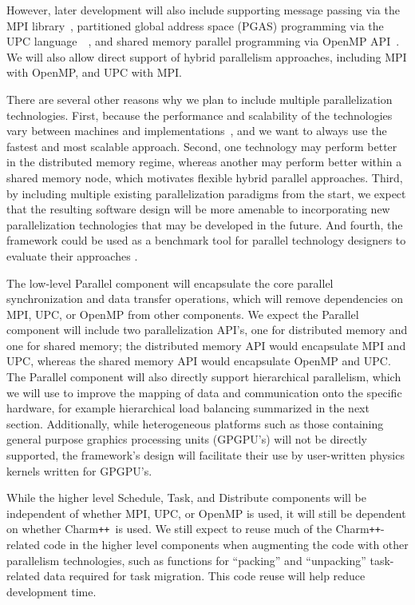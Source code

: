 \documentclass[11pt,letterpaper]{article}
\newcommand{\pp}{\texttt{++}}
\newcommand{\charm}{\textsf{Charm\pp}}
\newcommand{\code}[1]{\textsf{#1}}
\begin{document}
However, later development will also include supporting message
passing via the MPI library~\cite{wwwmpi}, partitioned global address
space (PGAS) programming via the UPC
language~\cite{wwwupc}~\cite{upc}, and shared memory parallel
programming via OpenMP API~\cite{wwwopenmp}.  We will also allow
direct support of hybrid parallelism approaches, including MPI with
OpenMP, and UPC with MPI. 

There are several other reasons why we plan to include multiple
parallelization technologies.  First, because the performance and
scalability of the technologies vary between machines and
implementations~\cite{MaTa09}, and we want to always use the fastest
and most scalable approach.  Second, one technology may perform better
in the distributed memory regime, whereas another may perform better
within a shared memory node, which motivates flexible hybrid parallel
approaches.  Third, by including multiple existing parallelization
paradigms from the start, we expect that the resulting software design
will be more amenable to incorporating new parallelization
technologies that may be developed in the future.  And fourth, the
framework could be used as a benchmark tool for parallel technology
designers to evaluate their approaches \cite{WeSu07}.

The low-level \code{Parallel} component will encapsulate the core
parallel synchronization and data transfer operations, which will
remove dependencies on MPI, UPC, or OpenMP from other components.  We
expect the \code{Parallel} component will include two parallelization
API's, one for distributed memory and one for shared memory; the
distributed memory API would encapsulate MPI and UPC, whereas the
shared memory API would encapsulate OpenMP and UPC.  The
\code{Parallel} component will also directly support hierarchical
parallelism, which we will use to improve the mapping of data and
communication onto the specific hardware, for example hierarchical
load balancing summarized in the next section.  Additionally, while
heterogeneous platforms such as those containing general purpose
graphics processing units (GPGPU's) will not be directly supported,
the framework's design will facilitate their use by user-written
physics kernels written for GPGPU's.

While the higher level \code{Schedule}, \code{Task}, and
\code{Distribute} components will be independent of whether MPI, UPC,
or OpenMP is used, it will still be dependent on whether \charm\ is
used.  We still expect to reuse much of the \charm-related code in the
higher level components when augmenting the code with other
parallelism technologies, such as functions for ``packing'' and
``unpacking'' task-related data required for task migration.  This
code reuse will help reduce development time.
\end{document}
